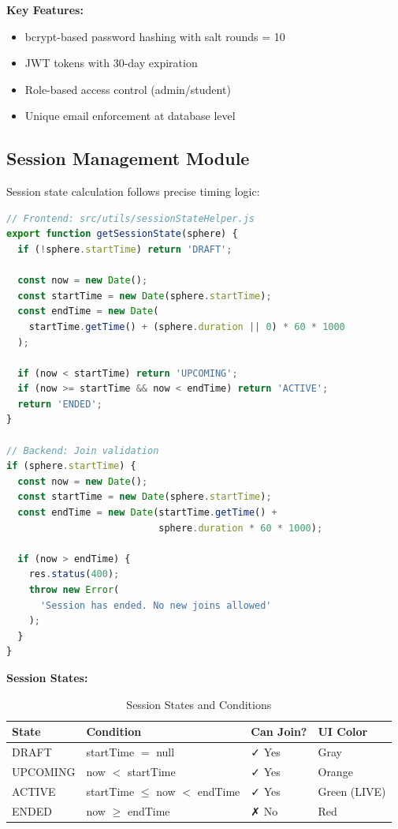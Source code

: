 \documentclass[12pt,a4paper]{report}
\newcommand{\rA}{\rowcolor{white}}
\newcommand{\rB}{\rowcolor{lightgray}}
\newcommand{\rH}{\rowcolor{headcol}}
\begin{document}
\textbf{Key Features:}
\begin{itemize}[left=0pt]
  \item bcrypt-based password hashing with salt rounds = 10
  \item JWT tokens with 30-day expiration
  \item Role-based access control (admin/student)
  \item Unique email enforcement at database level
\end{itemize}

\subsection{Session Management Module}

Session state calculation follows precise timing logic:

\begin{lstlisting}[language=JavaScript]
// Frontend: src/utils/sessionStateHelper.js
export function getSessionState(sphere) {
  if (!sphere.startTime) return 'DRAFT';
  
  const now = new Date();
  const startTime = new Date(sphere.startTime);
  const endTime = new Date(
    startTime.getTime() + (sphere.duration || 0) * 60 * 1000
  );
  
  if (now < startTime) return 'UPCOMING';
  if (now >= startTime && now < endTime) return 'ACTIVE';
  return 'ENDED';
}

// Backend: Join validation
if (sphere.startTime) {
  const now = new Date();
  const startTime = new Date(sphere.startTime);
  const endTime = new Date(startTime.getTime() + 
                           sphere.duration * 60 * 1000);
  
  if (now > endTime) {
    res.status(400);
    throw new Error(
      'Session has ended. No new joins allowed'
    );
  }
}
\end{lstlisting}

\textbf{Session States:}
\begin{table}[H]
  \centering
  \small
  \begin{tabular}{|l|l|l|l|}
    \hline
    \rH \textbf{State} & \textbf{Condition} & \textbf{Can Join?} & \textbf{UI Color} \\
    \hline
    \rA DRAFT & startTime $=$ null & ✓ Yes & Gray \\
    \hline
    \rB UPCOMING & now $<$ startTime & ✓ Yes & Orange \\
    \hline
    \rA ACTIVE & startTime $\leq$ now $<$ endTime & ✓ Yes & Green (LIVE) \\
    \hline
    \rB ENDED & now $\geq$ endTime & ✗ No & Red \\
    \hline
  \end{tabular}
  \caption{Session States and Conditions}
  \label{tab:session_states}
\end{table}
\end{document}
